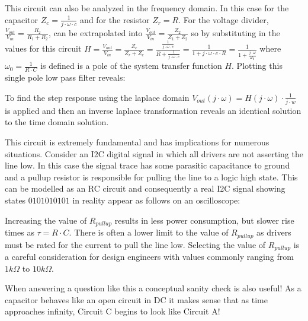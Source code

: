 \documentclass[main.tex]{subfiles}
\begin{document}

This circuit can also be analyzed in the frequency domain. In this case for the capacitor $Z_c = \frac{1}{j \cdot \omega \cdot c}$ and for the resistor $Z_r = R$. For the voltage divider, $\frac{V_{out}}{V_{in}} = \frac{R_2}{R_1 + R_2}$, can be extrapolated into $\frac{V_{out}}{V_{in}} = \frac{Z_2}{Z_1 + Z_2}$ so by substituting in the values for this circuit $H = \frac{V_{out}}{V_{in}} = \frac{Z_c}{Z_r + Z_c} = \frac{\frac{1}{j \cdot \omega \cdot c}}{R + \frac{1}{j \cdot \omega \cdot c}} = \frac{1}{1 + j \cdot \omega \cdot c \cdot R} = \frac{1}{1+\frac{j \cdot \omega}{\omega_{0}}}$ where $\omega_{0} = \frac{1}{R \cdot C}$ is defined is a pole of the system transfer function $H$. Plotting this single pole low pass filter reveals:


To find the step response using the laplace domain $V_{out}(j \cdot \omega) = H(j \cdot \omega) \cdot \frac{1}{j \cdot w}$ is applied and then an inverse laplace transformation reveals an identical solution to the time domain solution.

This circuit is extremely fundamental and has implications for numerous situations. Consider an I2C digital signal in which all drivers are not asserting the line low. In this case the signal trace has some parasitic capacitance to ground and a pullup resistor is responsible for pulling the line to a logic high state. This can be modelled as an RC circuit and consequently a real I2C signal showing states $0101010101$ in reality appear as follows on an oscilloscope:


Increasing the value of $R_{pullup}$ results in less power consumption, but slower rise times as $\tau = R \cdot C$. There is often a lower limit to the value of $R_{pullup}$ as drivers must be rated for the current to pull the line low. Selecting the value of $R_{pullup}$ is a careful consideration for design engineers with values commonly ranging from $1 k \Omega$ to $10 k \Omega$.


When answering a question like this a conceptual sanity check is also useful! As a capacitor behaves like an open circuit in DC it makes sense that as time approaches infinity, Circuit C begins to look like Circuit A! 
\end{document}
